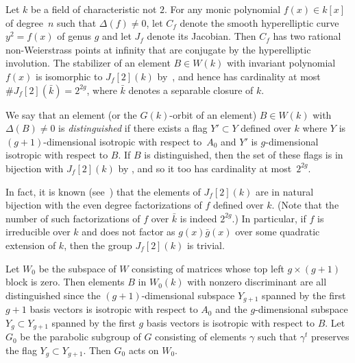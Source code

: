 Let $k$ be a field of characteristic not $2$.
For any monic polynomial $f(x)\in k[x]$ of degree~$n$ such
that $\Delta(f)\neq0$, let $C_f$ denote the smooth hyperelliptic curve
$y^2=f(x)$ of genus $g$ and let $J_f$ denote its Jacobian. Then $C_f$
has two rational non-Weierstrass points at infinity that are conjugate
by the hyperelliptic involution.
The stabilizer of an element $B\in W(k)$ with invariant polynomial $f(x)$
is isomorphic to $J_f[2](k)$ by~\cite[Proposition~2.33]{W}, and hence has cardinality at most $\#J_f[2](\bar k)=2^{2g}$, where $\bar k$ denotes a separable closure of $k$.

We say that an element (or the $G(k)$-orbit of an element) $B\in W(k)$ with $\Delta(B)\neq 0$ is
{\it distinguished} if there exists a flag $Y'\subset Y$ defined over
$k$ where $Y$ is $(g+1)$-dimensional isotropic with respect to~$A_0$
and $Y'$ is $g$-dimensional isotropic with respect to $B$. If $B$ is
distinguished, then the set of these flags is in bijection with
$J_f[2](k)$ by \cite[Proposition~2.32]{W},  and so it too has cardinality at most~$2^{2g}$.

In fact, it is known (see~\cite[Proposition~22]{BGWhyper}) that the elements of $J_f[2](k)$ are in natural bijection with the even degree factorizations of $f$ defined over $k$.  (Note that the number of such factorizations of $f$ over $\bar k$ is indeed $2^{2g}$.) In particular, if $f$ is irreducible over $k$ and does not factor as $g(x)\bar g(x)$ over some quadratic extension of $k$, then the group $J_f[2](k)$ is trivial.

Let $W_0$ be the subspace of $W$ consisting of matrices whose top left
$g\times (g+1)$ block is zero. Then elements $B$ in $W_0(k)$ with
nonzero discriminant are all distinguished since the $(g+1)$-dimensional
subspace $Y_{g+1}$ spanned by the first $g+1$ basis vectors is
isotropic with respect to $A_0$ and the $g$-dimensional subspace
$Y_g\subset Y_{g+1}$ spanned by the first $g$ basis vectors is
isotropic with respect to $B$.
Let $G_0$ be the parabolic subgroup of
$G$ consisting of elements $\gamma$ such that $\gamma^t$ preserves the
flag $Y_g\subset Y_{g+1}$. Then $G_0$ acts on $W_0$.

